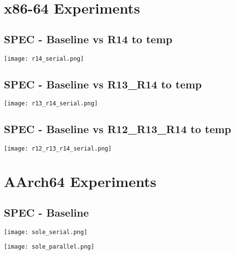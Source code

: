 \documentclass[11pt]{article}
\begin{document}
    \section{x86-64 Experiments}

    \subsection*{SPEC - Baseline vs R14 to temp}

    \texttt{[image: r14\_serial.png]}\par\vspace{0,5cm}

    \subsection*{SPEC - Baseline vs R13\_R14 to temp}

    \texttt{[image: r13\_r14\_serial.png]}\par\vspace{0,5cm}

    \subsection*{SPEC - Baseline vs R12\_R13\_R14 to temp}

    \texttt{[image: r12\_r13\_r14\_serial.png]}\par\vspace{0,5cm}

    \section{AArch64 Experiments}

    \subsection*{SPEC - Baseline}

    \texttt{[image: sole\_serial.png]}\par\vspace{0,5cm}
    \texttt{[image: sole\_parallel.png]}\par\vspace{0,5cm}
\end{document}
